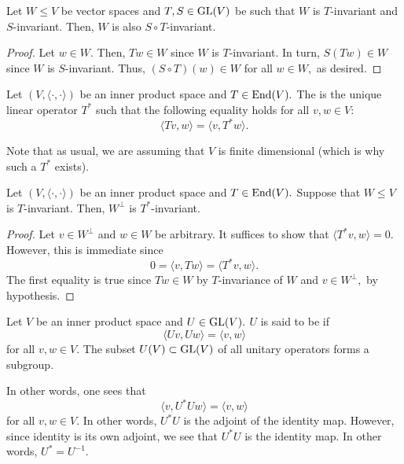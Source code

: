 \begin{prop} \label{prop:STinvariance}
	Let $W \le V$ be vector spaces and $T, S \in \operatorname{GL}(V)$ be such that $W$ is $T$-invariant and $S$-invariant. Then, $W$ is also $S \circ T$-invariant.
\end{prop}
\begin{proof} 
	Let $w \in W.$ Then, $Tw \in W$ since $W$ is $T$-invariant. In turn, $S(Tw) \in W$ since $W$ is $S$-invariant. Thus, $(S \circ T)(w) \in W$ for all $w \in W,$ as desired.
\end{proof}

\begin{defn}%
	Let $(V, \langle \cdot, \cdot\rangle)$ be an inner product space and $T \in \operatorname{End}(V).$ The  is the unique linear operator $T^*$ such that the following equality holds for all $v, w \in V:$
	\begin{equation*} 
		\langle Tv, w\rangle = \langle v, T^*w\rangle.
	\end{equation*}
\end{defn}

Note that as usual, we are assuming that $V$ is finite dimensional (which is why such a $T^*$ exists).

\begin{prop} \label{prop:Tadjointinvariance}
	Let $(V, \langle \cdot, \cdot\rangle)$ be an inner product space and $T \in \operatorname{End}(V).$ Suppose that $W \le V$ is $T$-invariant. Then, $W^\perp$ is $T^*$-invariant.
\end{prop}
\begin{proof} 
	Let $v \in W^\perp$ and $w \in W$ be arbitrary. It suffices to show that $\langle T^*v, w\rangle = 0.$ However, this is immediate since
	\begin{equation*} 
		0 = \langle v, Tw\rangle = \langle T^*v, w\rangle.
	\end{equation*}
	The first equality is true since $Tw \in W$ by $T$-invariance of $W$ and $v \in W^\perp,$ by hypothesis.
\end{proof}

\begin{defn}%
	\label{defn:unitaryoperator}
	Let $V$ be an inner product space and $U \in \operatorname{GL}(V).$ $U$ is said to be  if 
	\begin{equation*} 
		\langle Uv, Uw\rangle = \langle v, w\rangle
	\end{equation*}
	for all $v, w \in V.$ The subset $U(V) \subset \operatorname{GL}(V)$ of all unitary operators forms a subgroup.
\end{defn}
In other words, one sees that
\begin{equation*} 
	\langle v, U^*Uw\rangle = \langle v, w\rangle
\end{equation*}
for all $v, w \in V.$ In other words, $U^*U$ is the adjoint of the identity map. However, since identity is its own adjoint, we see that $U^*U$ is the identity map. In other words, $U^* = U^{-1}.$

